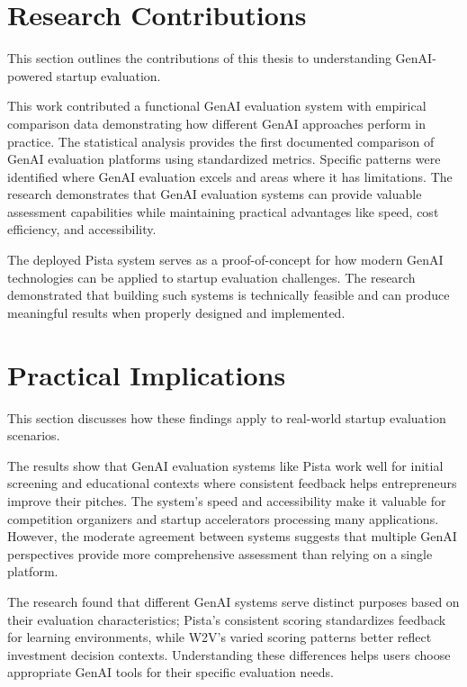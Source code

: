 \section{Research Contributions}
\label{sec:contributions}

This section outlines the contributions of this thesis to understanding GenAI-powered startup evaluation.

This work contributed a functional GenAI evaluation system with empirical comparison data demonstrating how different GenAI approaches perform in practice. The statistical analysis provides the first documented comparison of GenAI evaluation platforms using standardized metrics. Specific patterns were identified where GenAI evaluation excels and areas where it has limitations. The research demonstrates that GenAI evaluation systems can provide valuable assessment capabilities while maintaining practical advantages like speed, cost efficiency, and accessibility.

The deployed Pista system serves as a proof-of-concept for how modern GenAI technologies can be applied to startup evaluation challenges. The research demonstrated that building such systems is technically feasible and can produce meaningful results when properly designed and implemented.

\clearpage
\section{Practical Implications}
\label{sec:implications}

This section discusses how these findings apply to real-world startup evaluation scenarios.

The results show that GenAI evaluation systems like Pista work well for initial screening and educational contexts where consistent feedback helps entrepreneurs improve their pitches. The system's speed and accessibility make it valuable for competition organizers and startup accelerators processing many applications. However, the moderate agreement between systems suggests that multiple GenAI perspectives provide more comprehensive assessment than relying on a single platform.

The research found that different GenAI systems serve distinct purposes based on their evaluation characteristics; Pista's consistent scoring standardizes feedback for learning environments, while W2V's varied scoring patterns better reflect investment decision contexts. Understanding these differences helps users choose appropriate GenAI tools for their specific evaluation needs.

